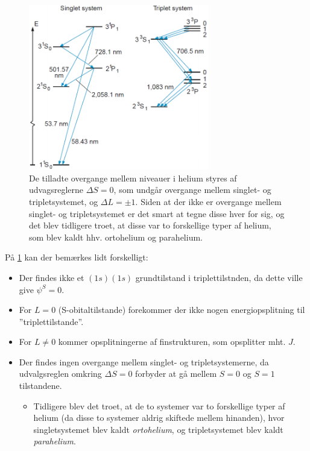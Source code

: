\begin{figure}[!h]
    \centering
    \includegraphics[width=0.7\textwidth]{Q11/images/SingletOgtripletTilstandeIHelium.PNG}
    \caption{De tilladte overgange mellem niveauer i helium styres af udvagsreglerne $\Delta S = 0$, som undgår overgange mellem singlet- og tripletsystemet, og $\Delta L = \pm 1$. Siden at der ikke er overgange mellem singlet- og tripletsystemet er det smart at tegne disse hver for sig, og det blev tidligere troet, at disse var to forskellige typer af helium, som blev kaldt hhv. ortohelium og parahelium.}
    \label{fig:Q11_SingletOgTripletTilstandeIHelium}
\end{figure}

På \cref{fig:Q11_SingletOgTripletTilstandeIHelium} kan der bemærkes lidt forskelligt:
\begin{itemize}
    \item Der findes ikke et $(1s)(1s)$ grundtilstand i triplettilstnden, da dette ville give $\psi^S = 0$.
    \item For $L = 0$ (S-obitaltilstande) forekommer der ikke nogen energiopsplitning til ''triplettilstande''.
    \item For $L \ne 0$ kommer opsplitningerne af finstrukturen, som opsplitter mht. $J$.
    \item Der findes ingen overgange mellem singlet- og tripletsystemerne, da udvalgsreglen omkring $\Delta S = 0$ forbyder at gå mellem $S = 0$ og $S = 1$ tilstandene.
    \begin{itemize}
        \item Tidligere blev det troet, at de to systemer var to forskellige typer af helium (da disse to systemer aldrig skiftede mellem hinanden), hvor singletsystemet blev kaldt \emph{ortohelium}, og tripletsystemet blev kaldt \emph{parahelium}.
    \end{itemize}
\end{itemize}